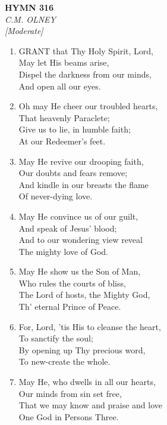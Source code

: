 \documentclass[11pt,a4paper]{article}
\begin{document}
\newpage
\begin{center}
    {\Large \textbf{HYMN 316}}
    \\
    \textit{C.M. OLNEY}
    \\
    \textit{\small [Moderate]}
\end{center}
\vspace{1em}

\begin{enumerate}
    \item GRANT that Thy Holy Spirit, Lord, \\
        May let His beams arise, \\
        Dispel the darkness from our minds, \\
        And open all our eyes.

    \item Oh may He cheer our troubled hearts, \\
        That heavenly Paraclete; \\
        Give us to lie, in humble faith; \\
        At our Redeemer's feet.

    \item May He revive our drooping faith, \\
        Our doubts and fears remove; \\
        And kindle in our breasts the flame \\
        Of never-dying love.

    \item May He convince us of our guilt, \\
        And speak of Jesus' blood; \\
        And to our wondering view reveal \\
        The mighty love of God.

    \item May He show us the Son of Man, \\
        Who rules the courts of bliss, \\
        The Lord of hosts, the Mighty God, \\
        Th' eternal Prince of Peace.

    \item For, Lord, 'tis His to cleanse the heart, \\
        To sanctify the soul; \\
        By opening up Thy precious word, \\
        To new-create the whole.

    \item May He, who dwells in all our hearts, \\
        Our minds from sin set free, \\
        That we may know and praise and love \\
        One God in Persons Three.

\end{enumerate}
\end{document}
